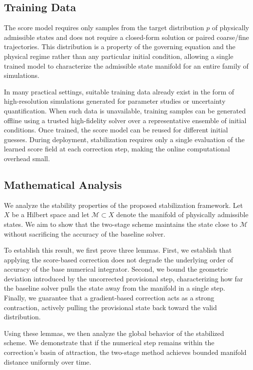 \documentclass[letterpaper]{article} %
\begin{document}
\subsection{Training Data}

The score model requires only samples from the target distribution $p$ of
physically admissible states and does not require a closed-form solution or
paired coarse/fine trajectories. This distribution is a property of the
governing equation and the physical regime rather than any particular initial
condition, allowing a single trained model to characterize the admissible
state manifold for an entire family of simulations.

In many practical settings, suitable training data already exist in the form
of high-resolution simulations generated for parameter studies or uncertainty
quantification. When such data is unavailable,
training samples can be generated offline using a trusted high-fidelity
solver over a representative ensemble of initial conditions.
Once trained, the score model can be reused for different initial guesses. During
deployment, stabilization requires only a single evaluation of the learned
score field at each correction step, making the online computational overhead
small.



\subsection{Mathematical Analysis}
\label{sec:math_analysis}

We analyze the stability properties of the proposed stabilization framework. Let $X$ be a Hilbert space and let $\mathcal{M}\subset X$ denote the manifold of physically admissible states. We aim to show that the two-stage scheme maintains the state close to $\mathcal{M}$ without sacrificing the accuracy of the baseline solver. 

To establish this result, we first prove three lemmas. First, we establish that applying the score-based correction does not degrade the underlying order of accuracy of the base numerical integrator. Second, we bound the geometric deviation introduced by the uncorrected provisional step, characterizing how far the baseline solver pulls the state away from the manifold in a single step. Finally, we guarantee that a gradient-based correction acts as a strong contraction, actively pulling the provisional state back toward the valid distribution.

Using these lemmas, we then analyze the global behavior of the stabilized scheme. We demonstrate that if the numerical step remains within the correction's basin of attraction, the two-stage method achieves bounded manifold distance uniformly over time.
\end{document}
